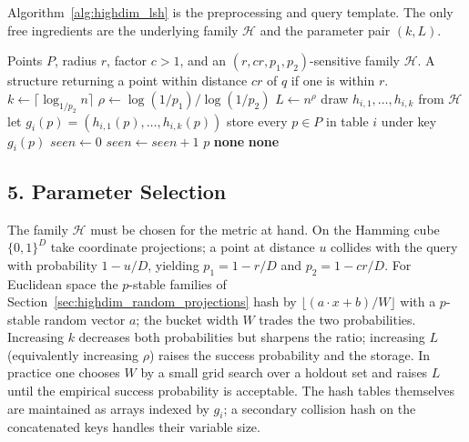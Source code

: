 Algorithm~\ref{alg:highdim_lsh} is the preprocessing and query template. The
only free ingredients are the underlying family $\mathcal{H}$ and the
parameter pair $(k, L)$.

\begin{algorithm}[htbp]
\caption{Locality-Sensitive Hashing for $(r,c)$-Near Neighbor}
\label{alg:highdim_lsh}
\begin{algorithmic}[1]
\Require Points $P$, radius $r$, factor $c > 1$, and an
$(r, cr, p_1, p_2)$-sensitive family $\mathcal{H}$.
\Ensure A structure returning a point within distance $cr$ of $q$ if one is within $r$.
  \State $k \gets \lceil \log_{1/p_2} n \rceil$ 
  \State $\rho \gets \log(1/p_1) / \log(1/p_2)$
  \State $L \gets n^{\rho}$ 
    \State draw $h_{i,1}, \dots, h_{i,k}$ from $\mathcal{H}$
    \State let $g_i(p) = (h_{i,1}(p), \dots, h_{i,k}(p))$
    \State store every $p \in P$ in table $i$ under key $g_i(p)$
  \EndFor
\EndFunction
{}
  \State $seen \gets 0$
      \State $seen \gets seen + 1$
       \State \Return $p$ \EndIf
       \State \Return \textbf{none} \EndIf
    \EndFor
  \EndFor
  \State \Return \textbf{none}
\EndFunction
\end{algorithmic}
\end{algorithm}

\subsection{5. Parameter Selection}

The family $\mathcal{H}$ must be chosen for the metric at hand. On the Hamming
cube $\{0,1\}^D$ take coordinate projections; a point at distance $u$ collides
with the query with probability $1 - u/D$, yielding
$p_1 = 1 - r/D$ and $p_2 = 1 - c r/D$. For Euclidean space the $p$-stable
families of Section~\ref{sec:highdim_random_projections} hash by
$\lfloor (a \cdot x + b)/W \rfloor$ with a $p$-stable random vector $a$; the
bucket width $W$ trades the two probabilities. Increasing $k$ decreases both
probabilities but sharpens the ratio; increasing $L$ (equivalently increasing
$\rho$) raises the success probability and the storage. In practice one
chooses $W$ by a small grid search over a holdout set and raises $L$ until the
empirical success probability is acceptable. The hash tables themselves are
maintained as arrays indexed by $g_i$; a secondary collision hash on the
concatenated keys handles their variable size.

